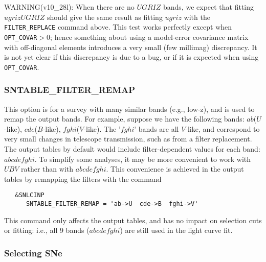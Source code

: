\documentclass[12pt]{article}
\begin{document}
\bigskip
WARNING(v10\_28l): 
When there are no $UGRIZ$ bands, we expect that fitting $ugrizUGRIZ$ 
should give the same result as fitting $ugriz$ with the 
{\tt FILTER\_REPLACE} command above. This test works perfectly 
except when  {\tt OPT\_COVAR}$>0$; 
hence something about using a model-error covariance matrix 
with off-diagonal elements introduces a very small 
(few millimag) discrepancy. It is not yet clear
if this discrepancy is due to a bug, or if it is expected
when using {\tt OPT\_COVAR}.


  \subsubsection{SNTABLE\_FILTER\_REMAP}
  \label{sss:filter_remap}

This option is for a survey with many similar bands (e.g., low-z),
and is used to remap the output bands. For example, suppose we
have the following bands: 
$ab$($U$-like), $cde$($B$-like), $fghi$($V$-like).
The '$fghi$' bands are all $V$-like, and correspond to very small 
changes in telescope transmission, such as from a filter replacement.
The output tables by default would include filter-dependent
values for each band: $abcdefghi$.  
To simplify some analyses, it may be more convenient to work
with $UBV$ rather than with $abcdefghi$.  
This convenience is achieved in the output tables
by remapping the filters with the command
\begin{verbatim}
   &SNLCINP
      SNTABLE_FILTER_REMAP = 'ab->U  cde->B  fghi->V'
\end{verbatim}
%
This command only affects the output tables, and has
no impact on selection cuts or fitting: 
i.e., all 9 bands ($abcdefghi$) are still
used in the light curve fit. 

  \clearpage
  \subsubsection{Selecting SNe}
  \label{sss:select_SN}
\end{document}
